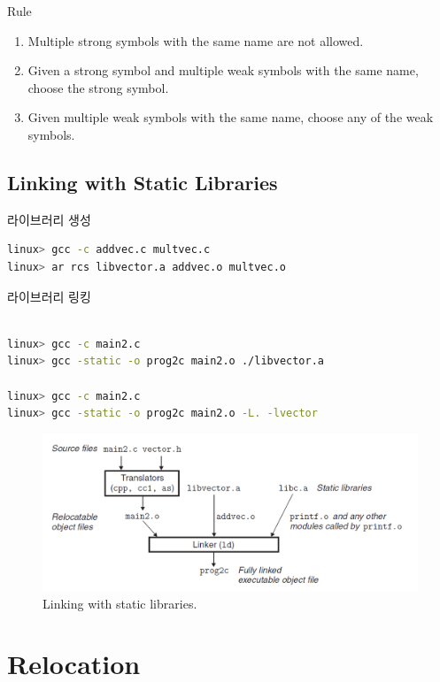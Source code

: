 Rule
\begin{enumerate}
    \item Multiple strong symbols with the same name are not allowed.
    \item Given a strong symbol and multiple weak symbols with the same name, choose the strong symbol.
    \item Given multiple weak symbols with the same name, choose any of the weak symbols.
\end{enumerate}

\subsection{Linking with Static Libraries}

라이브러리 생성

\begin{lstlisting}[language=bash]
linux> gcc -c addvec.c multvec.c
linux> ar rcs libvector.a addvec.o multvec.o
\end{lstlisting}

라이브러리 링킹

\begin{lstlisting}[language=bash]
    
linux> gcc -c main2.c
linux> gcc -static -o prog2c main2.o ./libvector.a

linux> gcc -c main2.c
linux> gcc -static -o prog2c main2.o -L. -lvector

\end{lstlisting}

\begin{figure}[h!]
    \centering
    \includegraphics[scale=0.5]{pic/section7/pic3.png}
    \caption{Linking with static libraries.}
\end{figure}




\section{Relocation}

